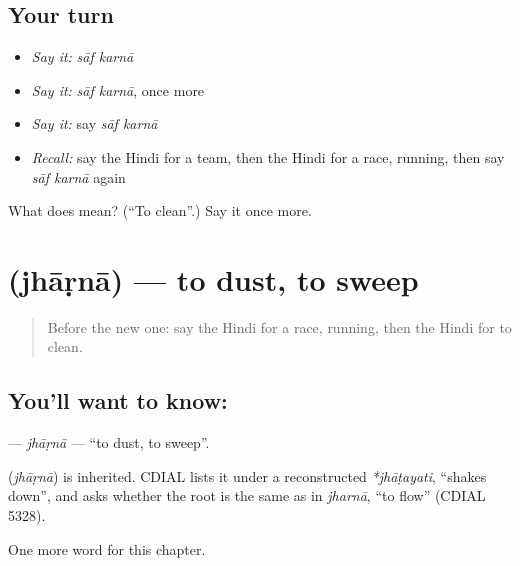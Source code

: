\subsection*{Your turn}
\begin{itemize}
\raggedright
  \item \emph{Say it:} \emph{sāf karnā}
  \item \emph{Say it:} \emph{sāf karnā}, once more
  \item \emph{Say it:} say \emph{sāf karnā}
  \item \emph{Recall:} say the Hindi for a team, then the Hindi for a race, running, then say \emph{sāf karnā} again
\end{itemize}

\begin{tcolorbox}[breakable,colback=teal!4,colframe=teal!35!black,title={Before you move on}]
What does   mean? (\textquotedblleft{}To clean\textquotedblright{}.) Say it once more.
\end{tcolorbox}
\section[\texorpdfstring{\hi{झाड़ना} (jhāṛnā)}{झाड़ना (jhāṛnā)}]{ (jhāṛnā) — to dust, to sweep}

\label{lesson:HI-C225-jharna}



\begin{quote}
Before the new one: say the Hindi for a race, running, then the Hindi for to clean.
\end{quote}

\subsection*{You'll want to know: }
\textbf{} — \emph{jhāṛnā} — \textquotedblleft{}to dust, to sweep\textquotedblright{}.

\begin{cousinweb}
\textbf{} (\emph{jhāṛnā}) is inherited. CDIAL lists it under a reconstructed \emph{*jhāṭayati}, \textquotedblleft{}shakes down\textquotedblright{}, and asks whether the root is the same as in \emph{jharnā}, \textquotedblleft{}to flow\textquotedblright{} (CDIAL 5328).
\end{cousinweb}

\begin{grammarlens}[title={What you've built}]
One more word for this chapter.
\end{grammarlens}

